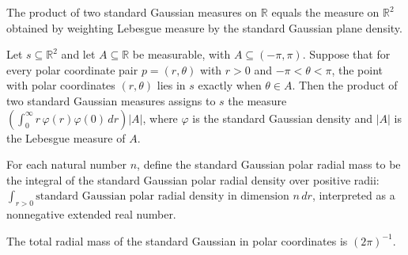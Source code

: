 \begin{theorem}
\label{FABL.standardGaussianPlane_eq_withDensity}
\leanok
{}
The product of two standard Gaussian measures on $\mathbb{R}$ equals the measure on
$\mathbb{R}^2$ obtained by weighting Lebesgue measure by the standard Gaussian plane
density.
\end{theorem}

\begin{theorem}
\label{FABL.standardGaussianPlane_measure_angularEvent}
\leanok
{}
Let $s\subseteq\mathbb{R}^2$ and let $A\subseteq\mathbb{R}$ be measurable, with
$A\subseteq(-\pi,\pi)$. Suppose that for every polar coordinate pair $p=(r,\theta)$ with
$r>0$ and $-\pi<\theta<\pi$, the point with polar coordinates $(r,\theta)$ lies in $s$
exactly when $\theta\in A$. Then the product of two standard Gaussian measures assigns
to $s$ the measure $\left(\int_0^\infty r\,\varphi(r)\varphi(0)\,dr\right)|A|$, where
$\varphi$ is the standard Gaussian density and $|A|$ is the Lebesgue measure of $A$.
\end{theorem}

\begin{definition}
\label{FABL.standardGaussianPolarRadialMass}
\leanok
{}
For each natural number $n$, define the standard Gaussian polar radial mass to be the
integral of the standard Gaussian polar radial density over positive radii: $\int_{r>0}
\text{standard Gaussian polar radial density in dimension }n\,dr$, interpreted as a
nonnegative extended real number.
\end{definition}

\begin{theorem}
\label{FABL.standardGaussianPolarRadialMass_eq}
\leanok
{}
The total radial mass of the standard Gaussian in polar coordinates is $(2\pi)^{-1}$.
\end{theorem}

